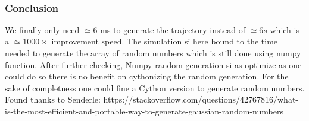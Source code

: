\documentclass[11pt]{article}
\begin{document}
    \begin{center}
    \end{center}
    { \hspace*{\fill} \\}
    
    \hypertarget{conclusion}{%
\subsubsection{Conclusion}\label{conclusion}}

We finally only need \(\simeq 6\) ms to generate the trajectory instead
of \(\simeq 6s\) which is a \(\simeq 1000\times\) improvement speed. The
simulation si here bound to the time needed to generate the array of
random numbers which is still done using numpy function. After further
checking, Numpy random generation si as optimize as one could do so
there is no benefit on cythonizing the random generation. For the sake
of completness one could fine a Cython version to generate random
numbers. Found thanks to Senderle:
https://stackoverflow.com/questions/42767816/what-is-the-most-efficient-and-portable-way-to-generate-gaussian-random-numbers
\end{document}
